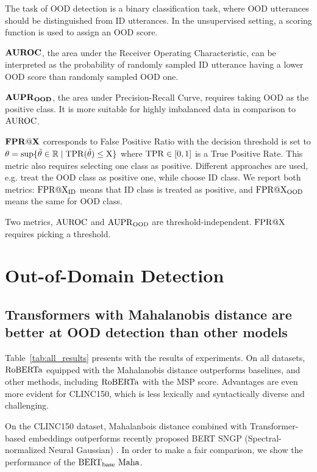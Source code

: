 \documentclass[letterpaper, final]{article} %
\begin{document}
The task of OOD detection is a binary classification task, where OOD utterances should be distinguished from ID utterances. In the unsupervised setting, a scoring function is used to assign an OOD score. 


$\rm{\mathbf{AUROC}}$, the area under the Receiver Operating Characteristic, can be interpreted as the probability of randomly sampled ID utterance having a lower OOD score than randomly sampled OOD one. 


$\rm{\mathbf{{AUPR}_{OOD}}}$, the area under Precision-Recall Curve, requires taking OOD as the positive class. It is more suitable for highly imbalanced data in comparison to $\rm{AUROC}$. 


$\rm{\mathbf{FPR@X}} $ corresponds to False Positive Ratio with the decision threshold is set to
$
 \theta = \sup \{\tilde\theta \in \mathbb{R} \mid \rm{TPR}(\tilde\theta) \leq X \}
$
where $\rm{TPR} \in [0,1]$ is a True Positive Rate. This metric also requires selecting one class as positive. Different approaches are used, e.g. \citet*{ll_ratio_nlp_facebook} treat the OOD class as positive one, while \citet*{zheng2020out} choose ID class. We report both metrics:  $\rm{FPR@X}_{ID}$ means that ID class is treated as positive, and $\rm{FPR@X}_{OOD}$ means the same for OOD class.


Two metrics, $\rm{AUROC}$ and $\rm{AUPR}_{OOD}$ are threshold-independent. $\rm{FPR@X} $ requires picking a threshold.



\section{Out-of-Domain Detection}
\label{sec: experiments}
\subsection{Transformers with Mahalanobis distance  are better at OOD detection than other models}

Table~\ref{tab:all_results} presents with the results of experiments. On all datasets, $\rm{RoBERTa}$ equipped with the Mahalanobis distance outperforms baselines, and other methods, including $\rm{RoBERTa}$ with the MSP score. Advantages are even more evident for CLINC150, which is less lexically and syntactically diverse and challenging. 

On the CLINC150 dataset, Mahalanbois distance combined with  Transformer-based embeddings outperforms recently proposed BERT SNGP (Spectral-normalized Neural Gaussian) \cite{liu2020simple}. In order to make a fair comparison, we show the performance of the $\rm{BERT_{base}\ Maha}$.
\end{document}
